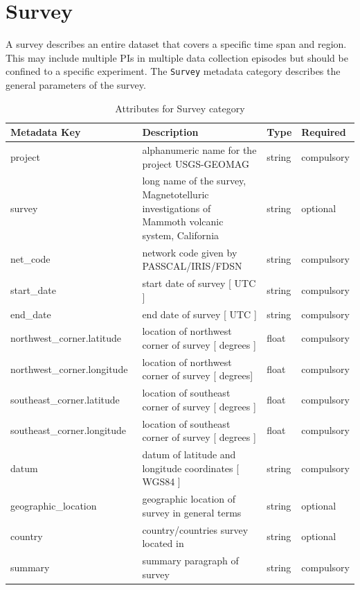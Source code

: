 \documentclass{article}
\begin{document}
\clearpage
\newpage
\section{Survey}

A survey describes an entire dataset that covers a specific time span and region. This may include multiple PIs in multiple data collection episodes but should be confined to a specific experiment. The \verb|Survey| metadata category describes the general parameters of the survey.

\begin{table}[htb!]
	\centering
	\caption[Attributes for Survey]{Attributes for Survey category}
	\begin{tabular}{|l|p{3.65in}|l|l|}
		\hline
		\textbf{Metadata Key} & \textbf{Description} & \textbf{Type} & \textbf{Required} \\ \hline
		project & alphanumeric name for the project USGS-GEOMAG & string & compulsory \\ \hline
		survey & long name of the survey, Magnetotelluric investigations of Mammoth volcanic system, California & string & optional \\ \hline
		net\_code\ & network code given by PASSCAL/IRIS/FDSN & string & compulsory \\ \hline
		start\_date\ & start date of survey [ UTC ] & string & compulsory \\ \hline
		end\_date\ & end date of survey [ UTC ] & string & compulsory \\ \hline
		northwest\_corner.latitude\ & location of northwest corner of survey [ degrees ] & float & compulsory \\ \hline
		northwest\_corner.longitude\ & location of northwest corner of survey [ degrees] & float & compulsory \\ \hline
		southeast\_corner.latitude\ & location of southeast corner of survey  [ degrees ] & float & compulsory \\ \hline
		southeast\_corner.longitude\ & location of southeast corner of survey  [ degrees ] & float & compulsory \\ \hline
		datum\ & datum of latitude and longitude coordinates [ WGS84 ] & string & compulsory \\ \hline
		geographic\_location\ & geographic location of survey in general terms & string & optional \\ \hline
		country\ & country/countries survey located in & string & optional \\ \hline
		summary\ & summary paragraph of survey & string & compulsory \\ \hline

\end{tabular}
\end{table}
\end{document}
